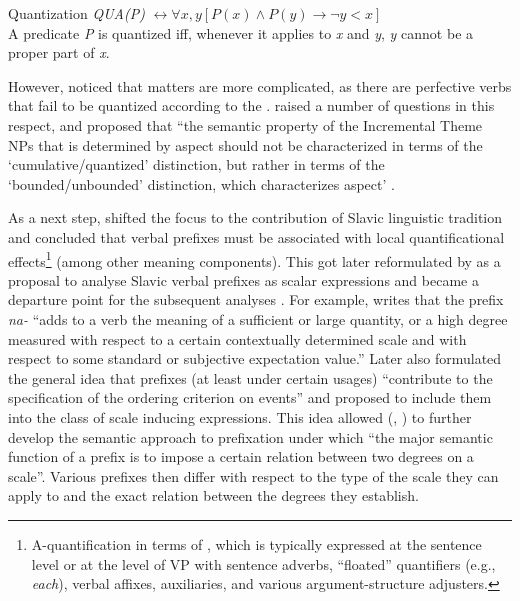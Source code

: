 \theoremstyle{definition}
\begin{definition}{Quantization}\label{def:quant}
\textit{QUA(P)} $\leftrightarrow \forall x,y[P(x) \wedge P(y) \rightarrow \neg y<x]$\\
A predicate \textit{P} is quantized iff, whenever it applies to \textit{x} and \textit{y}, \textit{y} cannot be a proper part of \textit{x}.
\end{definition}

However, \citet{Filip:92} noticed that matters are more complicated, as there are perfective verbs that fail to be quantized according to the . \citet{Filip:92} raised a number of questions in this respect, and proposed that ``the semantic property of the Incremental Theme NPs that is determined by aspect should not be characterized in terms of the `cumulative/quantized' distinction, but rather in terms of the `bounded/unbounded' distinction, which characterizes aspect' \citep[][147]{Filip:92}.

As a next step, \citet{Filip:92} shifted the focus to the contribution of Slavic linguistic tradition \citep{Wierzbicka:67, Rassudova:75, Merrill:85} and concluded that verbal prefixes must be associated with local quantificational effects\footnote{A-quantification in terms of \citealt{BachPartee:87, BachPartee:95}, which is typically expressed at the sentence level or at the level of VP with sentence adverbs, ``floated'' quantifiers (e.g., \textit{each}), verbal affixes, auxiliaries, and various argument-structure adjusters.} (among other meaning components). This got later reformulated by  \citet{Filip:99} as a proposal to analyse Slavic verbal prefixes as scalar expressions and became a departure point for the subsequent analyses \citep{Filip:00, Filip:03, Filip:05, FilipRothstein:05, Kagan:11, Kagan:12, Kagan:13, Kagan:book}. For example, \citet[183]{Filip:99} writes that the prefix \textit{na-} ``adds to a verb the meaning of a sufficient or large quantity, or a high degree measured with respect to a certain contextually determined scale and with respect to some standard or subjective expectation value.'' Later \citet{Filip:08} also formulated the general idea that prefixes (at least under certain usages) ``contribute to the specification of the ordering criterion on events'' and proposed to include them into the class of scale inducing expressions. This idea allowed \citeauthor{Kagan:12} (\citeyear{Kagan:12}, \citeyear{Kagan:book}) to further develop the semantic approach to prefixation under which ``the major semantic function of a prefix is to impose a certain relation between two degrees on a scale''. Various prefixes then differ with respect to the type of the scale they can apply to and the exact relation between the degrees  they establish. 

